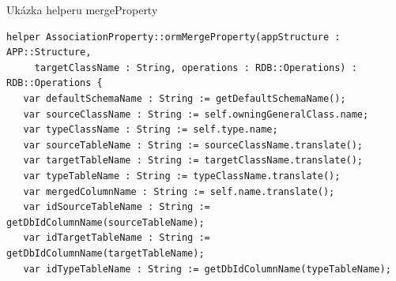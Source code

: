 \documentclass[11pt,twoside,a4paper]{book}
\begin{document}
Ukázka helperu mergeProperty
\label{orm_merge_prop}
\begin{verbatim}
helper AssociationProperty::ormMergeProperty(appStructure : APP::Structure, 
     targetClassName : String, operations : RDB::Operations) : RDB::Operations {
   var defaultSchemaName : String := getDefaultSchemaName();
   var sourceClassName : String := self.owningGeneralClass.name;
   var typeClassName : String := self.type.name;
   var sourceTableName : String := sourceClassName.translate();
   var targetTableName : String := targetClassName.translate();
   var typeTableName : String := typeClassName.translate();
   var mergedColumnName : String := self.name.translate();
   var idSourceTableName : String := getDbIdColumnName(sourceTableName);
   var idTargetTableName : String := getDbIdColumnName(targetTableName);
   var idTypeTableName : String := getDbIdColumnName(typeTableName);


\end{verbatim}
\end{document}
